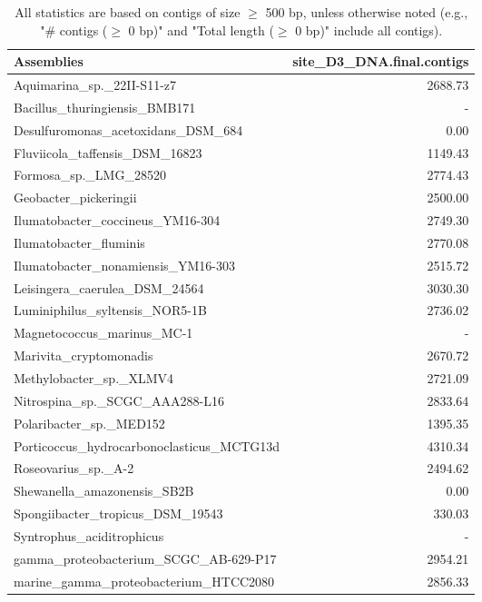 \documentclass[12pt,a4paper]{article}
\begin{document}
\begin{table}[ht]
\begin{center}
\caption{All statistics are based on contigs of size $\geq$ 500 bp, unless otherwise noted (e.g., "\# contigs ($\geq$ 0 bp)" and "Total length ($\geq$ 0 bp)" include all contigs).}
\begin{tabular}{|l*{1}{|r}|}
\hline
Assemblies & site\_D3\_DNA.final.contigs \\ \hline
Aquimarina\_sp.\_22II-S11-z7 & 2688.73 \\ \hline
Bacillus\_thuringiensis\_BMB171 & - \\ \hline
Desulfuromonas\_acetoxidans\_DSM\_684 & 0.00 \\ \hline
Fluviicola\_taffensis\_DSM\_16823 & 1149.43 \\ \hline
Formosa\_sp.\_LMG\_28520 & 2774.43 \\ \hline
Geobacter\_pickeringii & 2500.00 \\ \hline
Ilumatobacter\_coccineus\_YM16-304 & 2749.30 \\ \hline
Ilumatobacter\_fluminis & 2770.08 \\ \hline
Ilumatobacter\_nonamiensis\_YM16-303 & 2515.72 \\ \hline
Leisingera\_caerulea\_DSM\_24564 & 3030.30 \\ \hline
Luminiphilus\_syltensis\_NOR5-1B & 2736.02 \\ \hline
Magnetococcus\_marinus\_MC-1 & - \\ \hline
Marivita\_cryptomonadis & 2670.72 \\ \hline
Methylobacter\_sp.\_XLMV4 & 2721.09 \\ \hline
Nitrospina\_sp.\_SCGC\_AAA288-L16 & 2833.64 \\ \hline
Polaribacter\_sp.\_MED152 & 1395.35 \\ \hline
Porticoccus\_hydrocarbonoclasticus\_MCTG13d & 4310.34 \\ \hline
Roseovarius\_sp.\_A-2 & 2494.62 \\ \hline
Shewanella\_amazonensis\_SB2B & 0.00 \\ \hline
Spongiibacter\_tropicus\_DSM\_19543 & 330.03 \\ \hline
Syntrophus\_aciditrophicus & - \\ \hline
gamma\_proteobacterium\_SCGC\_AB-629-P17 & 2954.21 \\ \hline
marine\_gamma\_proteobacterium\_HTCC2080 & 2856.33 \\ \hline
\end{tabular}
\end{center}
\end{table}
\end{document}
